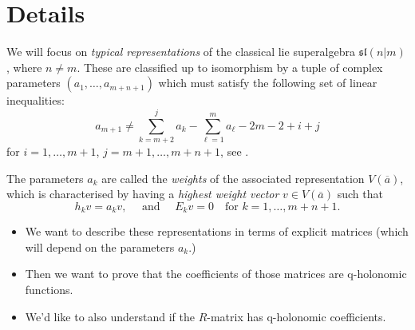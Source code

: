 \documentclass[a4paper]{article}
\begin{document}
\section*{Details}

We will focus on \emph{typical representations} of the classical lie superalgebra $\mathfrak{sl}(n|m)$, where $n \neq m$.
These are classified up to isomorphism by a tuple of complex parameters $(a_1,\ldots,a_{m+n+1})$ which must satisfy the following set of linear inequalities:
\begin{equation}
  a_{m+1} \neq \sum_{k=m+2}^j a_k - \sum_{\ell = 1}^m a_\ell -2m - 2 + i + j
\end{equation}
for $i = 1,\ldots,m+1$, $j = m+1,\ldots, m+n+1$, see \cite[Example 1, pg 620]{Kac_1978}.

The parameters $a_k$ are called the \emph{weights} of the associated representation $V(\overline{a})$, which is characterised by having a \emph{highest weight vector} $v \in V(\overline{a})$ such that
\begin{equation}
    h_k v = a_k v, \quad\text{ and }\quad E_k v = 0  \quad\text{for } k = 1,\ldots,m+n+1.
\end{equation}
\begin{itemize}
  \item We want to describe these representations in terms of explicit matrices (which will depend on the parameters $a_k$.)
  \item Then we want to prove that the coefficients of those matrices are q-holonomic functions.
  \item We'd like to also understand if the $R$-matrix has q-holonomic coefficients.
\end{itemize}




\end{document}
